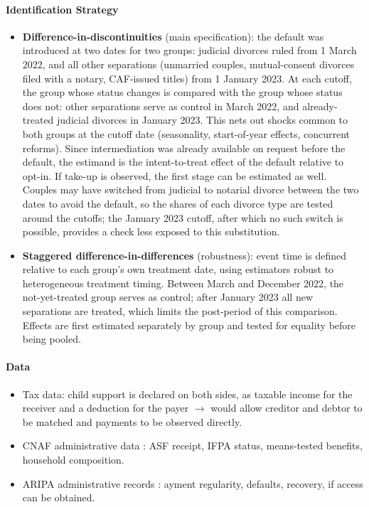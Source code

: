 \documentclass{article}
\begin{document}
\paragraph{Identification Strategy}
\begin{itemize}
    \item \textbf{Difference-in-discontinuities} (main specification): the default was introduced at two dates for two groups: judicial divorces ruled from 1 March 2022, and all other separations (unmarried couples, mutual-consent divorces filed with a notary, CAF-issued titles) from 1 January 2023. At each cutoff, the group whose status changes is compared with the group whose status does not: other separations serve as control in March 2022, and already-treated judicial divorces in January 2023. This nets out shocks common to both groups at the cutoff date (seasonality, start-of-year effects, concurrent reforms). Since intermediation was already available on request before the default, the estimand is the intent-to-treat effect of the default relative to opt-in. If take-up is observed, the first stage can be estimated as well. Couples may have switched from judicial to notarial divorce between the two dates to avoid the default, so the shares of each divorce type are tested around the cutoffs; the January 2023 cutoff, after which no such switch is possible, provides a check less exposed to this substitution.
    \item \textbf{Staggered difference-in-differences} (robustness): event time is defined relative to each group's own treatment date, using estimators robust to heterogeneous treatment timing. Between March and December 2022, the not-yet-treated group serves as control; after January 2023 all new separations are treated, which limits the post-period of this comparison. Effects are first estimated separately by group and tested for equality before being pooled.
\end{itemize}




\paragraph{Data}
\begin{itemize}
    \item Tax data: child support is declared on both sides, as taxable income for the receiver and a deduction for the payer $\rightarrow$ would allow creditor and debtor to be matched and payments to be observed directly.
    \item CNAF administrative data : ASF receipt, IFPA status, means-tested benefits, household composition.
    \item ARIPA administrative records : ayment regularity, defaults, recovery, if access can be obtained.
\end{itemize}
\end{document}
